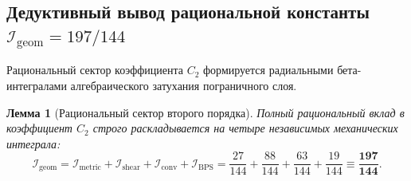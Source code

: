\documentclass[12pt,a4paper]{article}
\newtheorem{lemma}{Лемма}
\begin{document}
	\subsection{Дедуктивный вывод рациональной константы $\mathcal{I}_{\text{geom}} = 197/144$}
	Рациональный сектор коэффициента $C_2$ формируется радиальными бета-интегралами алгебраического затухания пограничного слоя.
	
	\begin{lemma}[Рациональный сектор второго порядка]
		Полный рациональный вклад в коэффициент $C_2$ строго раскладывается на четыре независимых механических интеграла:
		\begin{equation}
			\mathcal{I}_{\mathrm{geom}} = \mathcal{I}_{\mathrm{metric}} + \mathcal{I}_{\mathrm{shear}} + \mathcal{I}_{\mathrm{conv}} + \mathcal{I}_{\mathrm{BPS}} = \frac{27}{144} + \frac{88}{144} + \frac{63}{144} + \frac{19}{144} \equiv \mathbf{\frac{197}{144}}.
		\end{equation}
	\end{lemma}
	
\end{document}
